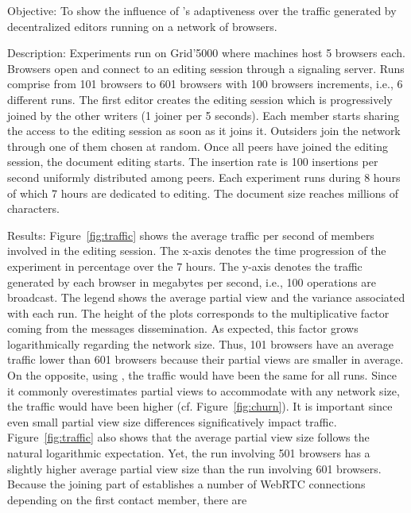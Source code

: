 \begin{asparadesc}
\item [Objective:] To show the influence of \SPRAY's adaptiveness over the
  traffic generated by decentralized editors running on a network of browsers.
\item [Description:] Experiments run on Grid'5000 where machines host 5 browsers
  each. Browsers open \CRATE and connect to an editing session through a
  signaling server.  Runs comprise from 101 browsers to 601 browsers with 100
  browsers increments, i.e., 6 different runs.  The first editor creates the
  editing session which is progressively joined by the other writers (1 joiner
  per 5 seconds). Each member starts sharing the access to the editing session
  as soon as it joins it. Outsiders join the network through one of them chosen
  at random. Once all peers have joined the editing session, the document
  editing starts. The insertion rate is 100 insertions per second uniformly
  distributed among peers. Each experiment runs during 8 hours of which 7 hours
  are dedicated to editing. The document size reaches millions of characters.
\item [Results:] Figure~\ref{fig:traffic} shows the average traffic
  per second of members involved in the editing session. The x-axis
  denotes the time progression of the experiment in percentage over
  the 7 hours. The y-axis denotes the traffic generated by each
  browser in megabytes per second, i.e., 100 operations are
  broadcast. The legend shows the average partial view and the
  variance associated with each run. The height of the plots
  corresponds to the multiplicative factor coming from the messages
  dissemination. As expected, this factor grows logarithmically
  regarding the network size. Thus, 101 browsers have an average
  traffic lower than 601 browsers because their partial views are
  smaller in average.  On the opposite, using \CYCLON, the traffic
  would have been the same for all runs. Since it commonly
  overestimates partial views to accommodate with any network size,
  the traffic would have been higher (cf. Figure~\ref{fig:churn}). It
  is important since even small partial view size differences
  significatively impact traffic.  Figure~\ref{fig:traffic} also shows
  that the average partial view size follows the natural logarithmic
  expectation. Yet, the run involving 501 browsers has a slightly
  higher average partial view size than the run involving 601
  browsers. Because the joining part of \SPRAY establishes a number of
  WebRTC connections depending on the first contact member, there are

\end{asparadesc}
